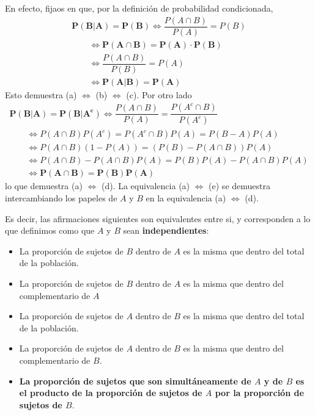 \documentclass[
]{book}
\theoremstyle{definition}
\theoremstyle{definition}
\theoremstyle{definition}
\theoremstyle{definition}
\theoremstyle{remark}
\begin{document}
\begin{rmdcorbes}
En efecto, fijaos en que, por la definición de probabilidad condicionada,
\[
\begin{array}{l}
\mathbf{P(B|A)=P(B)} \Longleftrightarrow \dfrac{P(A\cap B)}{P(A)}=P(B)\\ \qquad \Longleftrightarrow
\mathbf{P(A\cap B)=P(A)\cdot P(B)}
\\ \qquad \Longleftrightarrow \dfrac{P(A\cap B)}{P(B)}=P(A)\\ \qquad \Longleftrightarrow
\mathbf{P(A|B)=P(A)}
\end{array}
\]
Esto demuestra (a) \(\Leftrightarrow\) (b) \(\Leftrightarrow\) (c).
Por otro lado
\[
\begin{array}{l}
\mathbf{P(B|A)=P(B|A^c)}\Longleftrightarrow \dfrac{P(A\cap B)}{P(A)}=\dfrac{P(A^c\cap B)}{P(A^c)}\\ \qquad \Longleftrightarrow
P(A\cap B)P(A^c)=P(A^c\cap B)P(A)=P(B-A)P(A)\\ \qquad \Longleftrightarrow
P(A\cap B)(1-P(A))=(P(B)-P(A\cap B))P(A)\\ \qquad \Longleftrightarrow
P(A\cap B)-P(A\cap B)P(A)=P(B)P(A)-P(A\cap B)P(A)\\ \qquad \Longleftrightarrow
\mathbf{P(A\cap B)=P(B)P(A)}
\end{array}
\]
lo que demuestra (a) \(\Leftrightarrow\) (d). La equivalencia (a) \(\Leftrightarrow\) (e) se demuestra intercambiando los papeles de \(A\) y \(B\) en la equivalencia (a) \(\Leftrightarrow\) (d).
\end{rmdcorbes}

Es decir, las afirmaciones siguientes son equivalentes entre si, y corresponden a lo que definimos como que \(A\) y \(B\) sean \textbf{independientes}:

\begin{itemize}
\item
  La proporción de sujetos de \(B\) dentro de \(A\) es la misma que dentro del total de la población.
\item
  La proporción de sujetos de \(B\) dentro de \(A\) es la misma que dentro del complementario de \(A\)
\item
  La proporción de sujetos de \(A\) dentro de \(B\) es la misma que dentro del total de la población.
\item
  La proporción de sujetos de \(A\) dentro de \(B\) es la misma que dentro del complementario de \(B\).
\item
  \textbf{La proporción de sujetos que son simultáneamente de \(A\) y de \(B\) es el producto de la proporción de sujetos de \(A\) por la proporción de sujetos de \(B\)}.
\end{itemize}
\end{document}

